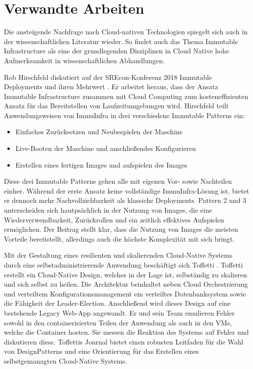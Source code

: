\documentclass[11pt]{scrartcl}
\begin{document}
\section{Verwandte Arbeiten}

Die ansteigende Nachfrage nach Cloud-nativen Technologien spiegelt sich auch in der wissenschaftlichen Literatur wieder. So findet auch das Thema Immutable Infrastructure als eine der grundlegenden Disziplinen in Cloud Native hohe Aufmerksamkeit in wissenschaftlichen Abhandlungen.

Rob Hirschfeld diskutiert auf der SREcon-Konferenz 2018 Immutable Deployments und ihren Mehrwert \cite{Hirschfeld:2018}. Er arbeitet heraus, dass der Ansatz Immutable Infrastructure zusammen mit Cloud Computing zum kosteneffizienten Ansatz für das Bereitstellen von Laufzeitumgebungen wird. Hirschfeld teilt Anwendungsweisen von ImmuInfra in drei verschiedene Immutable Patterns ein:  
\begin{itemize}
\item Einfaches Zurücksetzen und Neubespielen der Maschine
\item Live-Booten der Maschine und anschließendes Konfigurieren
\item Erstellen eines fertigen Images und aufspielen des Images
\end{itemize}

Diese drei Immutable Patterns gehen alle mit eigenen Vor- sowie Nachteilen einher.
Während der erste Ansatz keine vollständige ImmuInfra-Lösung ist, bietet er dennoch mehr Nachvollziehbarkeit als klassiche Deployments. Pattern 2 und 3 unterscheiden sich hautpsächlich in der Nutzung von Images, die eine Wiederverwendbarkeit, Zurückrollen und ein zeitlich effektives Aufspielen ermöglichen. Der Beitrag stellt klar, dass die Nutzung von Images die meisten Vorteile bereitstellt, allerdings auch die höchste Komplexität mit sich bringt.

Mit der Gestaltung eines resilienten und skalierenden Cloud-Native Systems durch eine selbstadministrierende Anwendung beschäftigt sich Toffetti \cite{Toffetti:2017}. Toffetti erstellt ein Cloud-Native Design, welches in der Lage ist, selbständig zu skalieren und
sich selbst zu heilen. Die Architektur beinhaltet neben Cloud Orchestrierung und verteiltem Konfigurationsmanagement ein verteiltes Datenbanksystem sowie die Fähigkeit der Leader-Election. Anschließend wird dieses Design auf eine bestehende Legacy Web-App angewandt. 
Er und sein Team emulieren Fehler sowohl in den containerisierten Teilen der Anwendung als auch in den VMs, welche die Container hosten. Sie messen die Reaktion des Systems auf Fehler und diskutieren diese. Toffettis Journal bietet einen robusten Leitfaden für die Wahl 
von DesignPatterns und eine Orientierung für das Erstellen eines selbstgemanagten Cloud-Native Systems.
\end{document}
